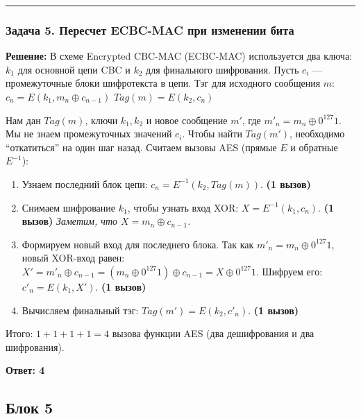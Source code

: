 \begin{center}\rule{0.5\linewidth}{0.5pt}\end{center}

\subsubsection{Задача 5. Пересчет ECBC-MAC при изменении бита}\label{ux437ux430ux434ux430ux447ux430-5.-ux43fux435ux440ux435ux441ux447ux435ux442-ecbc-mac-ux43fux440ux438-ux438ux437ux43cux435ux43dux435ux43dux438ux438-ux431ux438ux442ux430}

\textbf{Решение:} В схеме Encrypted CBC-MAC (ECBC-MAC) используется два ключа: \(k_1\) для основной цепи CBC и \(k_2\) для финального шифрования. Пусть \(c_{i}\) --- промежуточные блоки шифротекста в цепи. Тэг для исходного сообщения \(m\): \(c_n = E(k_1, m_n \oplus c_{n-1})\) \(Tag(m) = E(k_2, c_n)\)

Нам дан \(Tag(m)\), ключи \(k_1, k_2\) и новое сообщение \(m'\), где \(m'_n = m_n \oplus 0^{127}1\). Мы не знаем промежуточных значений \(c_i\). Чтобы найти \(Tag(m')\), необходимо ``откатиться'' на один шаг назад. Считаем вызовы AES (прямые \(E\) и обратные \(E^{-1}\)):

\begin{enumerate}
\def\labelenumi{\arabic{enumi}.}
\tightlist
\item
  Узнаем последний блок цепи: \(c_n = E^{-1}(k_2, Tag(m))\). \textbf{(1 вызов)}
\item
  Снимаем шифрование \(k_1\), чтобы узнать вход XOR: \(X = E^{-1}(k_1, c_n)\). \textbf{(1 вызов)} \emph{Заметим, что \(X = m_n \oplus c_{n-1}\).}
\item
  Формируем новый вход для последнего блока. Так как \(m'_n = m_n \oplus 0^{127}1\), новый XOR-вход равен: \(X' = m'_n \oplus c_{n-1} = (m_n \oplus 0^{127}1) \oplus c_{n-1} = X \oplus 0^{127}1\). Шифруем его: \(c'_n = E(k_1, X')\). \textbf{(1 вызов)}
\item
  Вычисляем финальный тэг: \(Tag(m') = E(k_2, c'_n)\). \textbf{(1 вызов)}
\end{enumerate}

Итого: \(1 + 1 + 1 + 1 = 4\) вызова функции AES (два дешифрования и два шифрования).

\textbf{Ответ: 4}

\subsection{Блок 5}\label{ux431ux43bux43eux43a-5}

